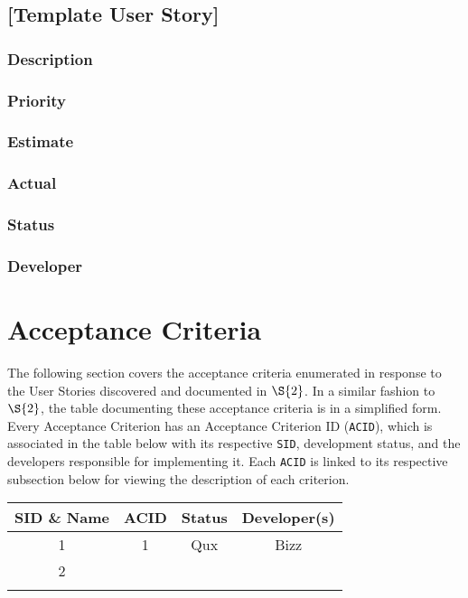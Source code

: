 \documentclass[11pt]{article}
\begin{document}
\subsection*{[Template User Story]}
\label{sec:org872dd89}
\subsubsection*{Description}
\label{sec:org11c2f02}
\subsubsection*{Priority}
\label{sec:org60ba569}
\subsubsection*{Estimate}
\label{sec:orgb3a3f61}
\subsubsection*{Actual}
\label{sec:orgbc26ac9}
\subsubsection*{Status}
\label{sec:org6fd7044}
\subsubsection*{Developer}
\label{sec:org4be799f}
\section{Acceptance Criteria}
\label{sec:orgd8c15f3}
The following section covers the acceptance criteria enumerated in response to the User Stories
discovered and documented in \hyperref[sec:orgb72f50b]{\(\S{2}\)}. In a similar fashion to \(\S{2}\), the table documenting these
acceptance criteria is in a simplified form. Every Acceptance Criterion has an Acceptance
Criterion ID (\texttt{ACID}), which is associated in the table below with its respective \texttt{SID}, development
status, and the developers responsible for implementing it. Each \texttt{ACID} is linked to its respective
subsection below for viewing the description of each criterion.

\begin{center}
\begin{tabular}{|c|c|c|c|}
SID \& Name & ACID & Status & Developer(s)\\
\hline
1 & 1 & Qux & Bizz\\
\hline
2 &  &  & \\
\hline
 &  &  & \\
\end{tabular}
\end{center}
\end{document}
